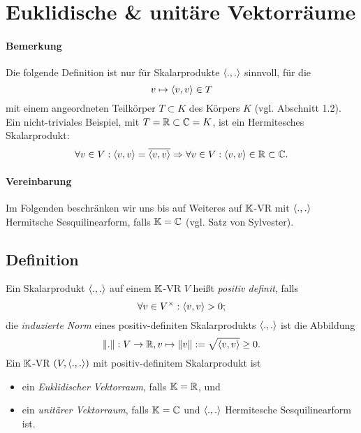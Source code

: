 \section{Euklidische \& unitäre Vektorräume}


\paragraph{Bemerkung}
	Die folgende Definition ist nur für Skalarprodukte $ \langle .,. \rangle $ sinnvoll, für die
		\[ v\mapsto \langle  v,v \rangle \in T \]
	mit einem angeordneten Teilkörper $ T \subset K $ des Körpers $ K $ (vgl. Abschnitt 1.2).
	Ein nicht-triviales Beispiel, mit $ T=\mathbb{R}\subset \mathbb{C} = K $, ist ein Hermitesches Skalarprodukt:
		\[ \forall v\in V: \langle  v,v \rangle = \overline{\langle  v,v \rangle} \Rightarrow \forall v\in V: \langle  v,v \rangle \in \mathbb{R}\subset \mathbb{C}. \]
\paragraph{Vereinbarung}
	Im Folgenden beschränken wir uns bis auf Weiteres auf $ \mathbb{K} $-VR mit $ \langle .,. \rangle $ Hermitsche Sesquilinearform, falls $ \mathbb{K} = \mathbb{C} $ (vgl. Satz von Sylvester).
	
\subsection{Definition}
\begin{Definition}
	Ein Skalarprodukt $ \langle .,. \rangle $ auf einem $ \mathbb{K} $-VR $ V $ heißt \emph{positiv definit}, falls
		\[ \forall v\in V^\times:\langle  v,v \rangle >0; \]
	die \emph{induzierte Norm} eines positiv-definiten Skalarprodukts $ \langle .,. \rangle $ ist die Abbildung
		\[ \|.\|: V\to \mathbb{R}, v\mapsto \|v\| := \sqrt{\langle  v,v \rangle}\geq 0. \]
	Ein $ \mathbb{K} $-VR $ (V,\langle .,. \rangle ) $ mit positiv-definitem Skalarprodukt ist
		\begin{itemize}
			\item ein \emph{Euklidischer Vektorraum}, falls $ \mathbb{K}=\mathbb{R} $, und
			\item ein \emph{unitärer Vektorraum}, falls $ \mathbb{K} = \mathbb{C} $ und $ \langle .,. \rangle $ Hermitesche Sesquilinearform ist. 
		\end{itemize}
\end{Definition}

